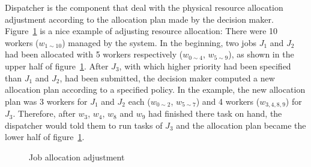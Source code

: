 Dispatcher is the component that deal with the physical resource
allocation adjustment according to the allocation plan made by the
decision maker.  Figure~\ref{fig:allocation-adjustment} is a nice
example of adjusting resource allocation: There were 10 workers
($w_{1\sim10}$) managed by the system.  In the beginning, two jobs $J_1$
and $J_2$ had been allocated with 5 workers respectively ($w_{0\sim4}$,
$w_{5\sim9}$), as shown in the upper half of
figure~\ref{fig:allocation-adjustment}.  After $J_3$, with which higher
priority had been specified than $J_1$ and $J_2$, had been submitted,
the decision maker computed a new allocation plan according to a
specified policy.  In the example, the new allocation plan was 3 workers
for $J_1$ and $J_2$ each ($w_{0\sim2}$, $w_{5\sim7}$) and 4 workers
($w_{3,4,8,9}$) for $J_3$.  Therefore, after $w_3$, $w_4$, $w_8$ and $
w_9$ had finished there task on hand, the dispatcher would told them to
run tasks of $J_3$ and the allocation plan became the lower half of
figure~\ref{fig:allocation-adjustment}.

\begin{figure}
  \centering
  
  \caption{Job allocation adjustment}
  \label{fig:allocation-adjustment}
\end{figure}
